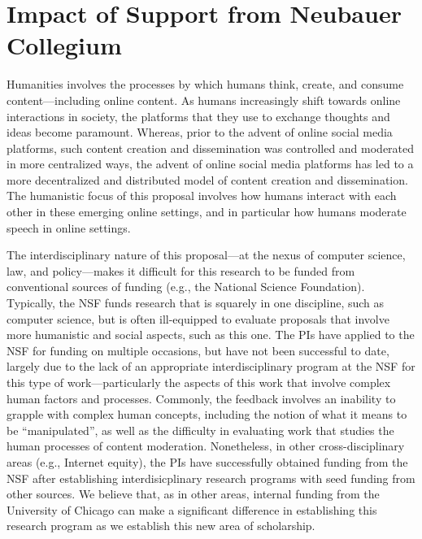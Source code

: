 \section{Impact of Support from Neubauer Collegium}
\label{sec:support}

Humanities involves the processes by which humans think, create, and consume
content---including online content. As humans increasingly shift towards
online interactions in society, the platforms that they use to exchange
thoughts and ideas become paramount. Whereas, prior to the advent of online
social media platforms, such content creation and dissemination was controlled
and moderated in more centralized ways, the advent of online social media
platforms has led to a more decentralized and distributed model of content
creation and dissemination.  The humanistic focus of this proposal involves
how humans interact with each other in these emerging online settings, and in
particular how humans moderate speech in online settings.

The interdisciplinary nature of this proposal---at the nexus of computer
science, law, and policy---makes it difficult for this research to be funded
from conventional sources of funding (e.g., the National Science Foundation).
Typically, the NSF funds research that is squarely in one discipline, such as
computer science, but is often ill-equipped to evaluate proposals that involve
more humanistic and social aspects, such as this one. The PIs have applied to
the NSF for funding on multiple occasions, but have not been successful to
date, largely due to the lack of an appropriate interdisciplinary program at
the NSF for this type of work---particularly the aspects of this work that
involve complex human factors and processes. Commonly, the feedback involves
an inability to grapple with complex human concepts, including the notion of
what it means to be ``manipulated'', as well as the difficulty in evaluating
work that studies the human processes of content moderation.  Nonetheless, in
other cross-disciplinary areas (e.g., Internet equity), the PIs have
successfully obtained funding from the NSF after establishing
interdisicplinary research programs with seed funding from other sources. We
believe that, as in other areas, internal funding from the University of
Chicago can make a significant difference in establishing this research
program as we establish this new area of scholarship.

